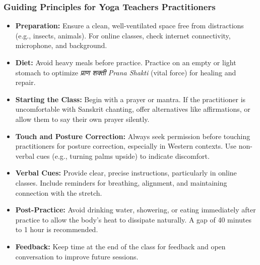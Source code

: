 \begin{frame}[fragile]\frametitle{Guiding Principles for Yoga Teachers Practitioners}

\begin{itemize}
    \item \textbf{Preparation:} Ensure a clean, well-ventilated space free from distractions (e.g., insects, animals). For online classes, check internet connectivity, microphone, and background.
    \item \textbf{Diet:} Avoid heavy meals before practice. Practice on an empty or light stomach to optimize \textit{प्राण शक्ती Prana Shakti} (vital force) for healing and repair.
    \item \textbf{Starting the Class:} Begin with a prayer or mantra. If the practitioner is uncomfortable with Sanskrit chanting, offer alternatives like affirmations, or allow them to say their own prayer silently.
    \item \textbf{Touch and Posture Correction:} Always seek permission before touching practitioners for posture correction, especially in Western contexts. Use non-verbal cues (e.g., turning palms upside) to indicate discomfort.
    \item \textbf{Verbal Cues:} Provide clear, precise instructions, particularly in online classes. Include reminders for breathing, alignment, and maintaining connection with the stretch.
    \item \textbf{Post-Practice:} Avoid drinking water, showering, or eating immediately after practice to allow the body’s heat to dissipate naturally. A gap of 40 minutes to 1 hour is recommended.
    \item \textbf{Feedback:} Keep time at the end of the class for feedback and open conversation to improve future sessions.
\end{itemize}

\end{frame}

